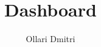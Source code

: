 \documentclass{report}
\title{Dashboard}
\author{Ollari Dmitri}
\begin{document}
\newtheorem*{theorem}{Teorema}
    \maketitle

    
\end{document}
